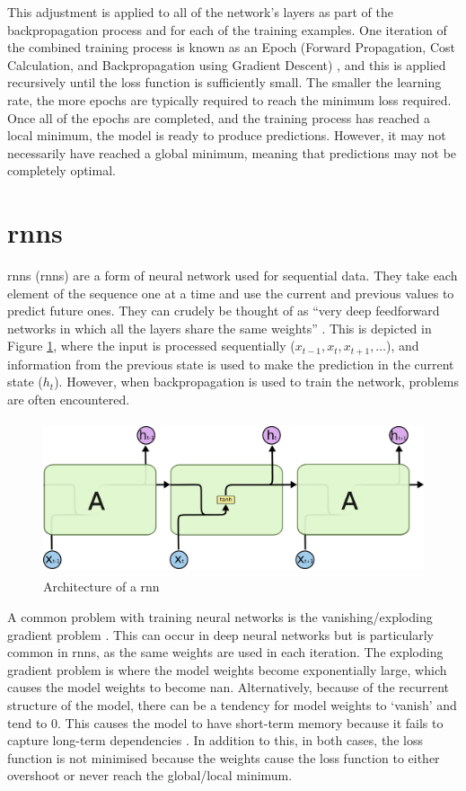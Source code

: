 This adjustment is applied to all of the network's layers as part of the backpropagation process and for each of the training examples. One iteration of the combined training process is known as an Epoch (Forward Propagation, Cost Calculation, and Backpropagation using Gradient Descent) \citep{Sharma}, and this is applied recursively until the loss function is sufficiently small. The smaller the learning rate, the more epochs are typically required to reach the minimum loss required. Once all of the epochs are completed, and the training process has reached a local minimum, the model is ready to produce predictions. However, it may not necessarily have reached a global minimum, meaning that predictions may not be completely optimal.

\section{\acrlong{rnn}s}\label{sec:background_rnns}
\acrlong{rnn}s (\acrshort{rnn}s) are a form of neural network used for sequential data. They take each element of the sequence one at a time and use the current and previous values to predict future ones. They can crudely be thought of as ``very deep feedforward networks in which all the layers share the same weights'' \citep{Yann}. This is depicted in Figure \ref{fig:rnn_architecture}, where the input is processed sequentially ($x_{t-1}, x_{t}, x_{t+1},\ldots$), and information from the previous state is used to make the prediction in the current state ($h_{t}$). However, when backpropagation is used to train the network, problems are often encountered.

\begin{figure}[h]
    \centering
    \includegraphics[height=4.5cm,trim={0 0 0cm 0cm},clip]{paper/images/rnn.png}
    \caption{Architecture of a \acrlong{rnn} \citep{olah2015understanding}}
    \label{fig:rnn_architecture}
\end{figure}

A common problem with training neural networks is the vanishing/exploding gradient problem \citep{hochreiter1997long}. This can occur in deep neural networks but is particularly common in \acrshort{rnn}s, as the same weights are used in each iteration. The exploding gradient problem is where the model weights become exponentially large, which causes the model weights to become \acrshort{nan}. Alternatively, because of the recurrent structure of the model, there can be a tendency for model weights to `vanish' and tend to 0. This causes the model to have short-term memory because it fails to capture long-term dependencies \citep{chung2014empirical}. In addition to this, in both cases, the loss function is not minimised because the weights cause the loss function to either overshoot or never reach the global/local minimum.

